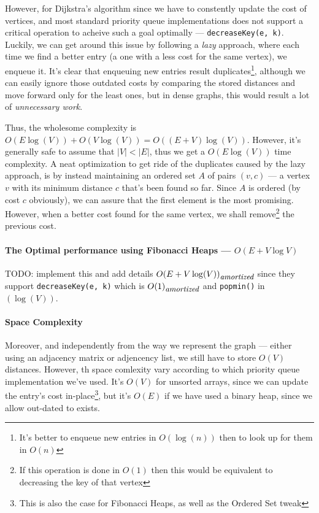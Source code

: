 \documentclass[12pt]{article}
\begin{document}
However, for Dijkstra's algorithm since we have to constently update the cost of vertices, and most standard priority queue implementations does not support a critical operation to acheive such a goal optimally --- \texttt{decreaseKey(e, k)}. Luckily, we can get around this issue by following a \textit{lazy} approach, where each time we find a better entry (a one with a less cost for the same vertex), we enqueue it. It's clear that enqueuing new entries result duplicates\footnote{It's better to enqueue new entries in $O(\log(n))$ then to look up for them in $O(n)$}, although we can easily ignore those outdated costs by comparing the stored distances and move forward only for the least ones, but in dense graphs, this would result a lot of \textit{unnecessary work}.

Thus, the wholesome complexity is $O(E\log(V)) + O(V\log(V)) = O((E + V)\log(V))$. However, it's generally safe to assume that $|V| < |E|$, thus we get a $O(E\log(V))$ time complexity. A neat optimization to get ride of the duplicates caused by the lazy approach, is by instead maintaining an ordered set $A$ of pairs $(v, c)$ --- a vertex $v$ with its minimum distance $c$ that's been found so far. Since $A$ is ordered (by cost $c$ obviously), we can assure that the first element is the most promising. However, when a better cost found for the same vertex, we shall remove\footnote{If this operation is done in $O(1)$ then this would be equivalent to decreasing the key of that vertex} the previous cost.

\paragraph{The Optimal performance using Fibonacci Heaps --- $O(E + V\log{V})$}

TODO: implement this and add details $O{(E + V\log(V))}_{\textit{\small amortized}}$ since they support \texttt{decreaseKey(e, k)} which is $O{(1)}_{\textit{\small amortized}}$ and \texttt{popmin()} in $(\log(V))$.





\paragraph{Space Complexity} Moreover, and independently from the way we represent the graph --- either using an adjacency matrix or adjencency list, we still have to store $O(V)$ distances. However, th space comlexity vary according to which priority queue implementation we've used. It's $O(V)$ for unsorted arrays, since we can update the entry's cost in-place\footnote{This is also the case for Fibonacci Heaps, as well as the Ordered Set tweak}, but it's $O(E)$ if we have used a binary heap, since we allow out-dated to exists.
\end{document}
